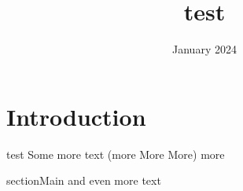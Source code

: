 \documentclass{article}
\title{test}
\author{ }
\date{January 2024}
\begin{document}
\maketitle

\section{Introduction}
test
Some more text (more More More)
more

section{Main}
and even more text
\end{document}
